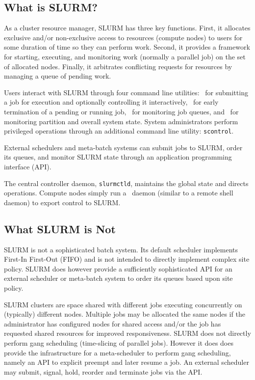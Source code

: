 \subsection{What is SLURM?}

As a cluster resource manager, SLURM has three key functions.  First,
it allocates exclusive and/or non-exclusive access to resources (compute nodes)
to users for 
some duration of time so they can perform work.  Second, it provides 
a framework for starting, executing, and monitoring work (normally a 
parallel job) on the set of allocated nodes.  Finally, it arbitrates 
conflicting requests for resources by managing a queue of pending work.

Users interact with SLURM through four command line utilities: 
\srun\ for submitting a job for execution and optionally controlling it
interactively, 
\scancel\ for early termination of a pending or running job, 
\squeue\ for monitoring job queues, and 
\sinfo\ for monitoring partition and overall system state.
System administrators perform privileged operations through an additional
command line utility: {\tt scontrol}.

External schedulers and meta-batch systems can submit jobs to SLURM, 
order its queues, and monitor SLURM state through an application 
programming interface (API).

The central controller daemon, {\tt slurmctld}, maintains the global state 
and directs operations.
Compute nodes simply run a \slurmd\ daemon (similar to a remote shell 
daemon) to export control to SLURM.  

\subsection{What SLURM is Not}

SLURM is not a sophisticated batch system.  Its default scheduler
implements First-In First-Out (FIFO) and is not 
intended to directly implement complex site policy.
SLURM does however provide a sufficiently sophisticated API for an external 
scheduler or meta-batch system to order its queues based upon site policy.

SLURM clusters are space shared with different jobs executing 
concurrently on (typically) different nodes. 
Multiple jobs may be allocated the same nodes 
if the administrator has configured nodes for shared access and/or 
the job has requested shared resources for improved responsiveness.
SLURM does not directly perform gang scheduling (time-slicing 
of parallel jobs). However it does does provide the infrastructure 
for a meta-scheduler to perform gang scheduling, namely an API 
to explicit preempt and later resume a job.
An external scheduler may submit, signal, hold, 
reorder and terminate jobs via the API.

